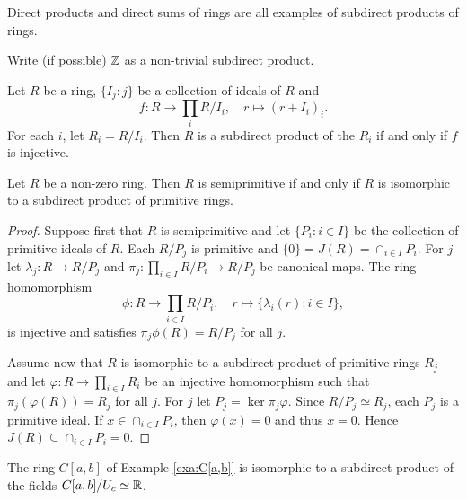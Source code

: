 Direct products and direct sums of rings are all examples of subdirect products of rings. 

\begin{exercise}
    Write (if possible) $\mathbb{Z}$ as a non-trivial subdirect product. 
\end{exercise}

\begin{example}
    Let $R$ be a ring,  
    $\{I_j:j\}$ be a collection of ideals of $R$ and
    \[
    f\colon R\to \prod_i R/I_i,
    \quad
    r\mapsto (r+I_i)_i.
    \]
    For each
    $i$, let $R_i=R/I_i$. Then $R$ is a subdirect product
    of the $R_i$ if and only if $f$ is injective. 
\end{example}



\begin{theorem}
	\label{thm:subdirecto}
	Let $R$ be a non-zero ring. Then $R$ is semiprimitive if and only if
	$R$ is isomorphic to a subdirect product of primitive rings. 
\end{theorem}

\begin{proof}
	Suppose first that $R$ is semiprimitive and let $\{P_i:i\in I\}$ be the collection of 
	primitive ideals of $R$. Each $R/P_j$ is primitive and 
	$\{0\}=J(R)=\cap_{i\in I}P_i$. For $j$ let $\lambda_j\colon R\to
	R/P_j$ and $\pi_j\colon \prod_{i\in I}R/P_i\to R/P_j$ be canonical maps. 
	The ring homomorphism 
	\[
		\phi\colon R\to\prod_{i\in I}R/P_i,\quad
		r\mapsto \{\lambda_i(r):i\in I\},
	\]
	is injective and satisfies $\pi_j\phi(R)=R/P_j$ for all 
	$j$.

	Assume now that $R$ is isomorphic to a subdirect product of primitive rings 
	$R_j$ and let $\varphi\colon R\to\prod_{i\in I}R_i$ be an injective homomorphism 
	such that $\pi_j(\varphi(R))=R_j$ for all $j$. For $j$ 
	let $P_j=\ker\pi_j\varphi$. Since $R/P_j\simeq R_j$, each $P_j$ is a primitive ideal. 
	If $x\in\cap_{i\in I}P_i$, then $\varphi(x)=0$ and thus $x=0$.
	Hence $J(R)\subseteq\cap_{i\in I} P_i=0$. 
\end{proof}


\begin{example}
	The ring $C[a,b]$ 
	of Example \ref{exa:C[a,b]}
	is isomorphic to a subdirect product of the fields 
	$C[a,b]/U_c\simeq\mathbb{R}$.
\end{example}

